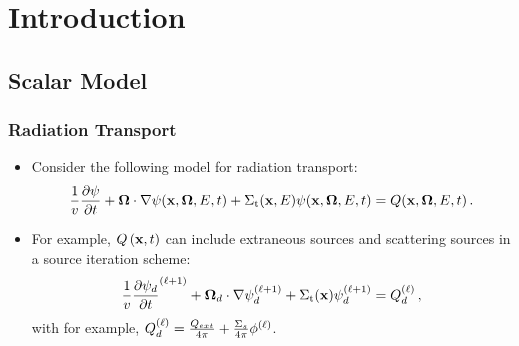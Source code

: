 \section{Introduction}
\subsection{Scalar Model}
\begin{frame}
\frametitle{Radiation Transport}

\begin{itemize}
  \item Consider the following model for radiation transport:
    \begin{equation}\label{eq:rad_transport}
      \frac{1}{v}\frac{\partial \psi}{\partial t}
        + \mathbf{\Omega}\cdot\nabla\psi(\mathbf{x},\mathbf{\Omega},E,t)
        + \Sigma_\text{t}(\mathbf{x},E)\psi(\mathbf{x},\mathbf{\Omega},E,t)
        = Q(\mathbf{x},\mathbf{\Omega},E,t) \,.
    \end{equation}
  \item For example, $Q\left(\mathbf{x},t\right)$ can include extraneous sources
    and scattering sources in a source iteration scheme:
    \begin{equation}
      \frac{1}{v}\frac{\partial \psi_d}{\partial t}^{(\ell+1)}
        + \mathbf{\Omega}_d\cdot\nabla\psi_d^{(\ell+1)}
        + \Sigma_\text{t}(\mathbf{x})\psi_d^{(\ell+1)}
        = Q_d^{(\ell)} \,,
    \end{equation}
    with for example, $Q_d^{(\ell)}=
    \frac{Q_{ext}}{4\pi} + \frac{\Sigma_s}{4\pi}\phi^{(\ell)}$.
\end{itemize}

\end{frame}
